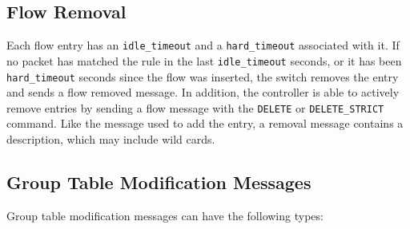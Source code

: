 \documentclass[10pt]{article}
\begin{document}
\subsection{Flow Removal}

Each flow entry has an \verb|idle_timeout| and a \verb|hard_timeout| associated with it.  If no packet has matched the rule in the last \verb|idle_timeout| seconds, or it has been \verb|hard_timeout| seconds since the flow was inserted, the switch removes the entry and sends a flow removed message.  In addition, the controller is able to actively remove entries by sending a flow message with the \verb|DELETE| or \verb|DELETE_STRICT| command.  Like the message used to add the entry, a removal message contains a description, which may include wild cards.

\subsection{Group Table Modification Messages}
\label{group_table:sec_chan:group_mod}
\label{group_table:sec_chan:group_add}
\label{group_table:sec_chan:group_set}
\label{group_table:sec_chan:group_delete}
Group table modification messages can have the following types:

\end{document}
